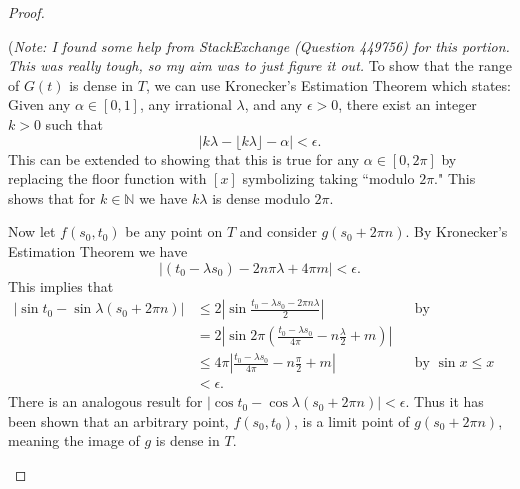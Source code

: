 \documentclass[leqno]{article}
\theoremstyle{nonumberplain}
\newtheorem{proof}{Proof}
\newcommand{\N}{\mathbb{N}}
\begin{document}
\begin{proof}
\begin{enumerate}[(a)]
(\emph{Note: I found some help from StackExchange (Question 449756) for this portion. This was really tough, so my aim was to just figure it out.} To show that the range of $G(t)$ is dense in $T$, we can use Kronecker's Estimation Theorem which states: Given any $\alpha\in [0,1]$, any irrational $\lambda$, and any $\epsilon>0$, there exist an integer $k>0$ such that
\[
|k\lambda-\lfloor k\lambda \rfloor -\alpha|<\epsilon.
\]
This can be extended to showing that this is true for any $\alpha\in [0,2\pi]$ by replacing the floor function with $[x]$ symbolizing taking ``modulo $2\pi$." This shows that for $k\in \N$ we have $k\lambda$ is dense modulo $2\pi$. 

Now let $f(s_0,t_0)$ be any point on $T$ and consider $g(s_0+2\pi n)$. By Kronecker's Estimation Theorem we have
\[
|(t_0-\lambda s_0) -2n\pi \lambda + 4\pi m| < \epsilon.
\]
This implies that
\begin{align*}
|\sin t_0 - \sin \lambda (s_0+2\pi n)|&\leq 2\left| \sin\frac{t_0-\lambda s_0 - 2\pi n \lambda}{2} \right| && \textrm{by trigonometric identities}\\
&= 2\left| \sin 2\pi \left( \frac{t_0-\lambda s_0}{4\pi}-n\frac{\lambda}{2}+m \right) \right|\\
&\leq 4\pi \left| \frac{t_0-\lambda s_0}{4\pi}-n \frac{\pi}{2}+m\right| && \textrm{by $\sin x \leq x$}\\
&<\epsilon.
\end{align*}
There is an analogous result for $|\cos t_0 - \cos \lambda(s_0+2\pi n)|<\epsilon$. Thus it has been shown that an arbitrary point, $f(s_0,t_0)$, is a limit point of $g(s_0+2\pi n)$, meaning the image of $g$ is dense in $T$.



\end{enumerate}
\end{proof}
\end{document}
